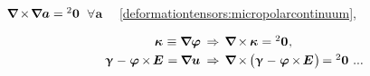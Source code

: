 \label{para:compatibilityequations.cosseratcontinuum}

 
${\boldnabla \hspace{-0.15ex} \times \hspace{-0.3ex} \boldnabla \bm{a} = {^2}\bm{0}}$~${\forall \bm{a}}$
~~\eqref{deformationtensors:micropolarcontinuum},

\nopagebreak\vspace{-0.8em}\begin{equation}
\begin{array}{r@{\hspace{1ex}}c@{\hspace{1ex}}l}
\wrynesstensor \hspace{.16ex} \equiv \boldnabla \fieldofrotations
& \hspace{.1ex} \Rightarrow &
\boldnabla \hspace{-0.15ex} \times \hspace{-0.1ex} \wrynesstensor \hspace{.1ex} = {^2}\bm{0}
\hspace{.1ex} ,
\\[.3em]
%
\distortiontensor \hspace{.1ex} - \hspace{.1ex} \fieldofrotations \hspace{-0.12ex} \times \hspace{-0.25ex} \UnitDyad \hspace{.12ex} = \hspace{-0.1ex} \boldnabla \fieldofdisplacements \hspace{.1ex}
& \hspace{.1ex} \Rightarrow &
\boldnabla \hspace{-0.15ex} \times \hspace{-0.2ex} \bigl(
\distortiontensor \hspace{.1ex} - \hspace{.1ex} \fieldofrotations \hspace{-0.12ex} \times \hspace{-0.25ex} \UnitDyad \hspace{.12ex}
\bigr) \hspace{-0.22ex}
= {^2}\bm{0}
\hspace{.8ex} ...
\end{array}
\end{equation}

